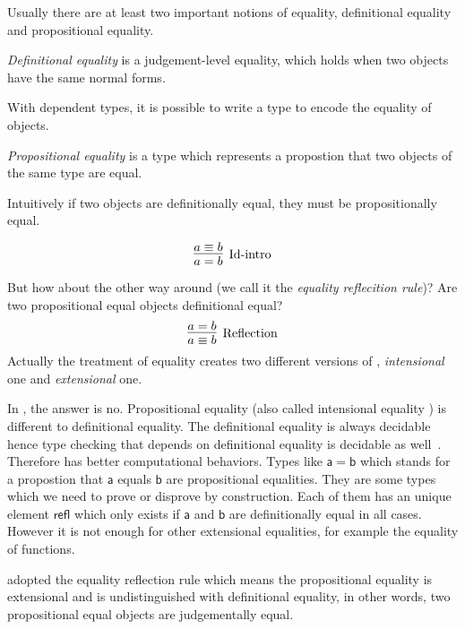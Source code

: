 Usually there are at least two important notions of equality, definitional equality and propositional equality.

\begin{definition}
\textit{Definitional equality} is a judgement-level equality, which holds when two objects have the same normal forms\cite{nor:90}.
\end{definition}

With dependent types, it is possible to write a type to encode the equality of objects.

\begin{definition}
\textit{Propositional equality} is a type which represents a propostion that two objects of the same type are equal.
\end{definition}

Intuitively if two objects are definitionally equal, they must be propositionally equal.

\begin{equation*}
\infer[\text{Id-intro}]{a = b}{a \equiv b}
\end{equation*}

But how about the other way around (we call it the \emph{equality reflecition rule})? Are two propositional equal objects definitional equal?
\begin{equation}
\label{reflection}
\infer[\text{Reflection}]{a \equiv b}{a = b}
\end{equation}
 Actually
the treatment of equality creates two different versions of \mltt, \emph{intensional} one and \emph{extensional} one.

In \itt, the answer is no. Propositional equality (also called intensional equality  \cite{nor:90}) is different to definitional equality. 
The definitional equality is always decidable hence type checking that depends on definitional equality is
decidable as well~\cite{alti:lics99}. Therefore \itt has better computational behaviors.
Types like $\mathsf{a = b}$ which stands for a
propostion that $\mathsf{a}$ equals $\mathsf{b}$ are propositional equalities. They are some types which we need to prove
or disprove by construction. Each of them has an unique element $\mathsf{refl}$ which only exists if $\mathsf{a}$ and $\mathsf{b}$ are
definitionally equal in all cases. However it is not enough for other extensional equalities, for example the equality of functions.


\ett adopted the equality reflection rule which means the propositional equality is extensional and is undistinguished with definitional equality, in other words, two propositional equal objects are judgementally equal.

